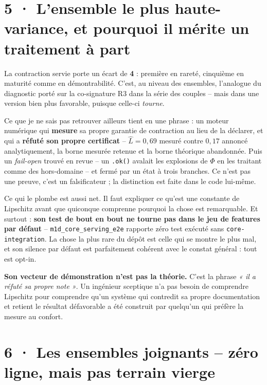 \documentclass[10pt]{article}
\newcommand{\code}[1]{\texttt{\small #1}}
\begin{document}
\section{5 · L'ensemble le plus haute-variance, et pourquoi il mérite un traitement à part}

La contraction servie porte un écart de \textbf{4} : première en rareté, cinquième en maturité comme en
démontrabilité. C'est, au niveau des ensembles, l'analogue du diagnostic porté sur la co-signature R3
dans la série des couples -- mais dans une version bien plus favorable, puisque celle-ci \emph{tourne}.

Ce que je ne sais pas retrouver ailleurs tient en une phrase : un moteur numérique qui \textbf{mesure}
sa propre garantie de contraction au lieu de la déclarer, et qui a \textbf{réfuté son propre
certificat} -- $\hat{L} = 0{,}69$ mesuré contre $0{,}17$ annoncé analytiquement, la borne mesurée
retenue et la borne théorique abandonnée. Puis un \emph{fail-open} trouvé en revue -- un \code{.ok()}
avalait les explosions de $\Phi$ en les traitant comme des hors-domaine -- et fermé par un état à trois
branches. Ce n'est pas une preuve, c'est un falsificateur ; la distinction est faite dans le code
lui-même.

Ce qui le plombe est aussi net. Il faut expliquer ce qu'est une constante de Lipschitz avant que
quiconque comprenne pourquoi la chose est remarquable. Et surtout : \textbf{son test de bout en bout ne
tourne pas dans le jeu de features par défaut} -- \code{m1d\_core\_serving\_e2e} rapporte zéro test
exécuté sans \code{core-integration}. La chose la plus rare du dépôt est celle qui se montre le plus
mal, et son silence par défaut est parfaitement cohérent avec le constat général : tout est opt-in.

\begin{piste}
\textbf{Son vecteur de démonstration n'est pas la théorie.} C'est la phrase \emph{« il a réfuté sa
propre note »}. Un ingénieur sceptique n'a pas besoin de comprendre Lipschitz pour comprendre qu'un
système qui contredit sa propre documentation et retient le résultat défavorable a été construit par
quelqu'un qui préfère la mesure au confort.
\end{piste}

\section{6 · Les ensembles joignants -- zéro ligne, mais pas terrain vierge}
\end{document}
